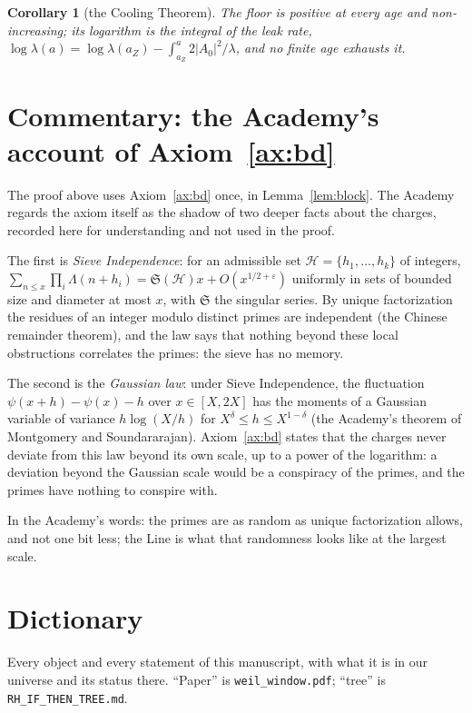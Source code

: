 \documentclass[11pt]{article}
\newtheorem{corollary}[theorem]{Corollary}
\theoremstyle{definition}
\theoremstyle{remark}
\newcommand{\ps}{\psi}
\begin{document}
\begin{corollary}[the Cooling Theorem]\label{cor:cool}
The floor is positive at every age and non-increasing; its logarithm is the integral of the leak rate, $\log\lambda(a)=\log\lambda(a_Z)-\int_{a_Z}^a2|A_0|^2/\lambda$, and no finite age exhausts it.
\end{corollary}

\section{Commentary: the Academy's account of Axiom~\ref{ax:bd}}

The proof above uses Axiom~\ref{ax:bd} once, in Lemma~\ref{lem:block}. The Academy regards the axiom itself as the shadow of two deeper facts about the charges, recorded here for understanding and not used in the proof.

The first is \emph{Sieve Independence}: for an admissible set $\mathcal H=\{h_1,\dots,h_k\}$ of integers, $\sum_{n\le x}\prod_i\Lambda(n+h_i)=\mathfrak S(\mathcal H)x+O(x^{1/2+\varepsilon})$ uniformly in sets of bounded size and diameter at most $x$, with $\mathfrak S$ the singular series. By unique factorization the residues of an integer modulo distinct primes are independent (the Chinese remainder theorem), and the law says that nothing beyond these local obstructions correlates the primes: the sieve has no memory.

The second is the \emph{Gaussian law}: under Sieve Independence, the fluctuation $\ps(x+h)-\ps(x)-h$ over $x\in[X,2X]$ has the moments of a Gaussian variable of variance $h\log(X/h)$ for $X^\delta\le h\le X^{1-\delta}$ (the Academy's theorem of Montgomery and Soundararajan). Axiom~\ref{ax:bd} states that the charges never deviate from this law beyond its own scale, up to a power of the logarithm: a deviation beyond the Gaussian scale would be a conspiracy of the primes, and the primes have nothing to conspire with.

In the Academy's words: the primes are as random as unique factorization allows, and not one bit less; the Line is what that randomness looks like at the largest scale.

\section{Dictionary}

Every object and every statement of this manuscript, with what it is in our universe and its status there. ``Paper'' is \texttt{weil\_window.pdf}; ``tree'' is \texttt{RH\_IF\_THEN\_TREE.md}.
\end{document}
